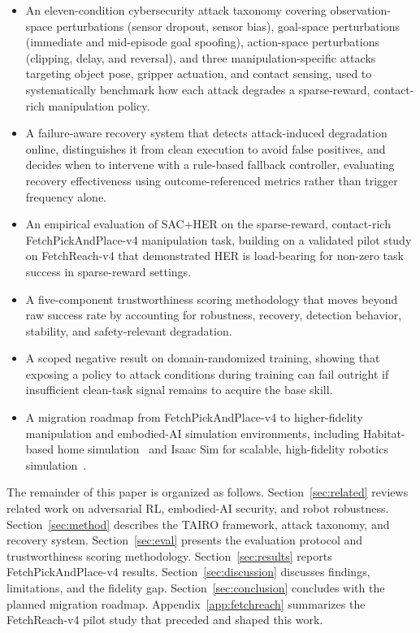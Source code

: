 \documentclass[conference]{IEEEtran}
\begin{document}
\begin{itemize}
    \item An eleven-condition cybersecurity attack taxonomy covering observation-space
          perturbations (sensor dropout, sensor bias), goal-space perturbations
          (immediate and mid-episode goal spoofing), action-space perturbations
          (clipping, delay, and reversal), and three manipulation-specific attacks
          targeting object pose, gripper actuation, and contact sensing, used to
          systematically benchmark how each attack degrades a sparse-reward,
          contact-rich manipulation policy.

    \item A failure-aware recovery system that detects attack-induced degradation
          online, distinguishes it from clean execution to avoid false positives, and
          decides when to intervene with a rule-based fallback controller, evaluating
          recovery effectiveness using outcome-referenced metrics rather than trigger
          frequency alone.

    \item An empirical evaluation of SAC+HER on the sparse-reward, contact-rich
          FetchPickAndPlace-v4 manipulation task, building on a validated pilot study
          on FetchReach-v4 that demonstrated HER is load-bearing for non-zero task
          success in sparse-reward settings.

    \item A five-component trustworthiness scoring methodology that moves beyond
          raw success rate by accounting for robustness, recovery, detection behavior,
          stability, and safety-relevant degradation.

    \item A scoped negative result on domain-randomized training, showing that
          exposing a policy to attack conditions during training can fail outright
          if insufficient clean-task signal remains to acquire the base skill.

    \item A migration roadmap from FetchPickAndPlace-v4 to higher-fidelity manipulation
          and embodied-AI simulation environments, including Habitat-based home
          simulation~\cite{puig2023habitat3} and Isaac Sim for scalable, high-fidelity
          robotics simulation~\cite{nvidia2026isaacsim}.
\end{itemize}

The remainder of this paper is organized as follows. Section~\ref{sec:related} reviews
related work on adversarial RL, embodied-AI security, and robot robustness. Section~\ref{sec:method}
describes the TAIRO framework, attack taxonomy, and recovery system. Section~\ref{sec:eval}
presents the evaluation protocol and trustworthiness scoring methodology. Section~\ref{sec:results}
reports FetchPickAndPlace-v4 results. Section~\ref{sec:discussion} discusses
findings, limitations, and the fidelity gap. Section~\ref{sec:conclusion} concludes
with the planned migration roadmap. Appendix~\ref{app:fetchreach} summarizes the
FetchReach-v4 pilot study that preceded and shaped this work.
\end{document}
